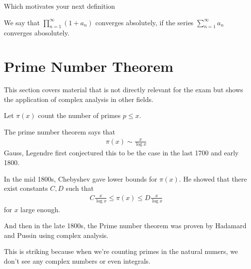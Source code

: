 Which motivates your next definition

\begin{definition}[]
	We say that $\prod_{n = 1}^{\infty}(1 + a_n)$ converges absolutely, if the series $\sum_{n=1}^{\infty}a_n$ converges abosolutely.
\end{definition}


\section{Prime Number Theorem}
This section covers material that is not directly relevant for the exam but shows the application of complex analysis in other fields.


Let $\pi(x)$ count the number of primes $p \leq x$.

The prime number theorem says that
\begin{align*}
	\pi(x) \sim \frac{x}{\log x}
\end{align*}
Gauss, Legendre first conjectured this to be the case in the last 1700 and early 1800.

In the mid 1800s, Chebyshev gave lower bounds for $\pi(x)$. He showed that there exist constants $C,D$ such that
\begin{align*}
	C \frac{x}{\log x}\leq \pi(x) \leq D \frac{x}{\log x}
\end{align*}
for $x$ large enough.

And then in the late 1800s, the Prime number theorem was proven by Hadamard and Pussin using complex analysis.

This is striking because when we're counting primes in the natural numers, we don't see any complex numbers or even integrals.


